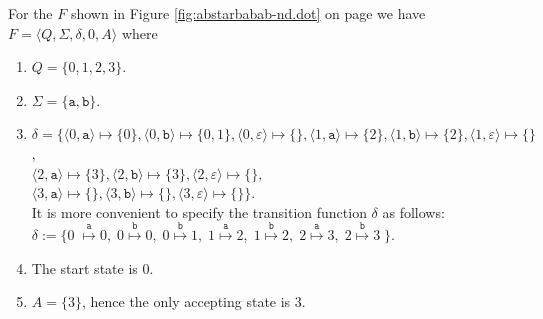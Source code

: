 \exampleEng
For the  $F$ shown in Figure \ref{fig:abstarbabab-nd.dot} on page \pageref{fig:abstarbabab-nd.dot} 
we have
\\[0.2cm]
\hspace*{1.3cm}
$F = \langle Q, \Sigma, \delta, 0, A\rangle$ \quad where
\begin{enumerate}
\item $Q = \{ 0, 1, 2, 3 \}$.
\item $\Sigma = \{ \texttt{a}, \texttt{b} \}$.
\item $\delta = \bigl\{ 
       \langle 0, \texttt{a}  \rangle \mapsto \{ 0 \},
       \langle 0, \texttt{b}  \rangle \mapsto \{ 0, 1 \},
       \langle 0, \varepsilon \rangle \mapsto \{ \},
       \langle 1, \texttt{a}  \rangle \mapsto \{ 2 \},
       \langle 1, \texttt{b}  \rangle \mapsto \{ 2 \},
       \langle 1, \varepsilon \rangle \mapsto \{  \}$,
      \\[0.2cm]
      \hspace*{0.74cm}
      $\langle 2, \texttt{a}  \rangle \mapsto \{ 3 \},
       \langle 2, \texttt{b}  \rangle \mapsto \{ 3 \}, 
       \langle 2, \varepsilon \rangle \mapsto \{ \},$
      \\[0.2cm]
      \hspace*{0.74cm}
      $\langle 3, \texttt{a}  \rangle \mapsto \{\},
       \langle 3, \texttt{b}  \rangle \mapsto \{\}, 
       \langle 3, \varepsilon \rangle \mapsto \{\}\bigr\}$.
      \\[0.2cm]
      It is more convenient to specify the transition function $\delta$ as follows:
      \\[0.2cm]
      \hspace*{1.3cm}
       $\delta := \bigl\{0\;  \stackrel{\texttt{a}}{\mapsto} 0,\;
        0 \stackrel{\texttt{b}}{\mapsto} 0,\;
        0 \stackrel{\texttt{b}}{\mapsto} 1,\;
        1 \stackrel{\texttt{a}}{\mapsto} 2,\;
        1 \stackrel{\texttt{b}}{\mapsto} 2,\;
        2 \stackrel{\texttt{a}}{\mapsto} 3,\;
       2 \stackrel{\texttt{b}}{\mapsto} 3\;\bigr\}$.
\item The start state is $0$.
\item $A = \{ 3 \}$, hence the only accepting state is $3$. \eox
\end{enumerate}
\vspace*{0.3cm}

